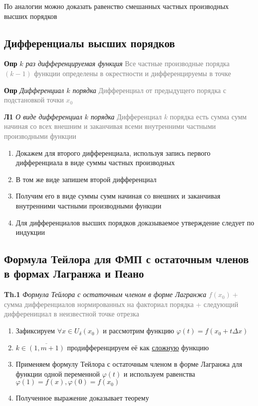 По аналогии можно доказать равенство смешанных частных производных высших порядков

\subsection{Дифференциалы высших порядков}

\textbf{Опр} \textit{$k$ раз дифференцируемая функция}
\textcolor{gray}{Все частные производные порядка $(k - 1)$ функции определены в окрестности и дифференцируемы в точке}

\textbf{Опр} \textit{Дифференциал $k$ порядка}
\textcolor{gray}{Дифференциал от предыдущего порядка с подстановкой точки $x_0$}

\textbf{Л1} \textit{О виде дифференциал $k$ порядка}
\textcolor{gray}{Дифференциал $k$ порядка есть сумма сумм начиная со всех внешним и заканчивая всеми внутренними
частными производными функции}

\begin{enumerate}
    \item Докажем для второго дифференциала, используя запись первого дифференциала в виде суммы частных производных
    \item В том же виде запишем второй дифференциал
    \item Получим его в виде суммы сумм начиная со внешних и заканчивая внутренними частными производными функции
    \item Для дифференциалов высших порядков доказываемое утверждение следует по индукции
\end{enumerate}

\subsection{Формула Тейлора для ФМП с остаточным членов в формах Лагранжа и Пеано}

\textbf{Th.1} \textit{Формула Тейлора с остаточным членом в форме Лагранжа}
\textcolor{gray}{$f(x_0) +$ сумма дифференциалов нормированных на факториал порядка +
следующий дифференициал в неизвестной точке отрезка}

\begin{enumerate}
    \item Зафиксируем $\forall x \in U_{\delta}(x_0)$ и рассмотрим функцию $\varphi(t) = f(x_0 + t\Delta x)$
    \item $k \in \overline{(1, m+1)}$ продифференцируем её как \underline{сложную} функцию
    \item Применяем формулу Тейлора с остаточным членом в форме Лагранжа для функции одной переменной $\varphi(t)$
    и используем равенства $\varphi (1) = f(x), \varphi (0) = f(x_0)$
    \item Полученное выражение доказывает теорему
\end{enumerate}


